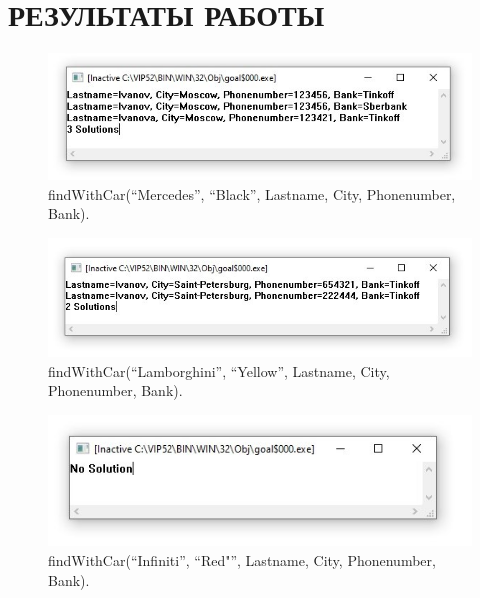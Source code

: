 \section{РЕЗУЛЬТАТЫ РАБОТЫ}

\begin{figure}[H]
    \centering
    \includegraphics[scale=0.8]{img/1.jpg}
    \caption{findWithCar(``Mercedes'', ``Black'', Lastname, City, Phonenumber, Bank).}
\end{figure}

\begin{figure}[H]
    \centering
    \includegraphics[scale=0.8]{img/2.jpg}
    \caption{findWithCar(``Lamborghini'', ``Yellow'', Lastname, City, Phonenumber, Bank).}
\end{figure}

\begin{figure}[H]
    \centering
    \includegraphics[scale=0.8]{img/3.jpg}
    \caption{findWithCar(``Infiniti'', ``Red"'', Lastname, City, Phonenumber, Bank).}
\end{figure}

